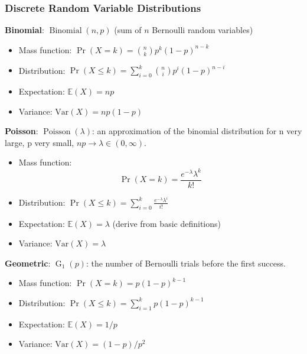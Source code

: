 \documentclass{article}
\newcommand{\E}{\mathbb{E}}
\newcommand{\Var}{\mathrm{Var}}
\begin{document}
\subsubsection{Discrete Random Variable Distributions}

\textbf{Binomial}: \(\operatorname{Binomial}(n, p)\) (sum of \(n\) Bernoulli random variables)

\begin{itemize}

\item Mass function: \(\Pr(X = k) = \binom{n}{k}p^k(1-p)^{n-k}  \)

\item Distribution: \(\Pr(X \leq k) = \sum_{i=0}^k \binom{n}{i}p^i(1-p)^{n-i} \)

\item Expectation: \(\E(X) = np \)

\item Variance: \(\Var(X) = np(1-p) \)

\end{itemize}

\textbf{Poisson}:  \(\operatorname{Poisson}(\lambda)\): an approximation of the binomial distribution for n very large, p very small, \(np \to \lambda \in (0, \infty)\).

\begin{itemize}

\item Mass function: \[\Pr(X = k) =  \frac{e^{-\lambda}\lambda^k}{k!} \]

\item Distribution: \(\Pr(X \leq k) = \sum_{i=0}^k  \frac{e^{-\lambda}\lambda^i}{i!}  \)

\item Expectation: \(\E(X) = \lambda \) (derive from basic definitions)

\item Variance: \(\Var(X) = \lambda\)

\end{itemize}

\textbf{Geometric}:  \(\operatorname{G}_1(p)\): the number of Bernoulli trials before the first success.

\begin{itemize}

\item Mass function: \(\Pr(X = k) = p(1-p)^{k-1} \)

\item Distribution: \(\Pr(X \leq k) = \sum_{i=1}^k p(1-p)^{k-1}  \)

\item Expectation: \(\E(X) = 1/p \)

\item Variance: \(\Var(X) = (1-p)/p^2\)

\end{itemize}
\end{document}
